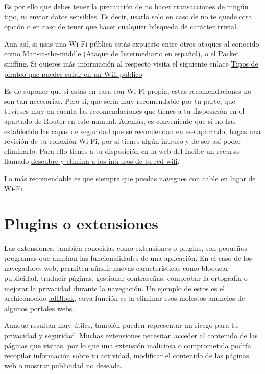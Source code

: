 \documentclass[
  spanish,
  a4paper,
  openany]{book}
\begin{document}
Es por ello que debes tener la precaución de no hacer transacciones de ningún tipo, ni enviar datos sensibles. Es decir, usarla solo en caso de no te quede otra opción o en caso de tener que hacer cualquier búsqueda de carácter trivial.

Aun así, si usas una Wi-Fi pública estás expuesto entre otros ataques al conocido como Man-in-the-middle (Ataque de Intermediario en español), o el Packet sniffing. Si quieres más información al respecto visita el siguiente enlace \href{https://as.com/meristation/2020/02/04/betech/1580856719_548183.html}{Tipos de pirateo que puedes sufrir en un Wifi público}

Es de suponer que si estas en casa con Wi-Fi propia, estas recomendaciones no son tan necesarias. Pero sí, que sería muy recomendable por tu parte, que tuvieses muy en cuenta las recomendaciones que tienes a tu disposición en el apartado de Router en este manual. Además, es conveniente que si no has establecido las capas de seguridad que se recomiendan en ese apartado, hagas una revisión de tu conexión Wi-Fi, por si tienes algún intruso y de ser así poder eliminarlo. Para ello tienes a tu disposición en la web del Incibe un recurso llamado \href{https://www.osi.es/es/actualidad/blog/2019/09/25/descubre-y-elimina-los-intrusos-de-tu-red-wifi}{descubre y elimina a los intrusos de tu red wifi}.

Lo más recomendable es que siempre que puedas navegues con cable en lugar de Wi-Fi.

\section{Plugins o extensiones}\label{plugins-o-extensiones}

Las extensiones, también conocidas como extensiones o plugins, son pequeños programas que amplían las funcionalidades de una aplicación. En el caso de los navegadores web, permiten añadir nuevas características como bloquear publicidad, traducir páginas, gestionar contraseñas, comprobar la ortografía o mejorar la privacidad durante la navegación. Un ejemplo de estos es el archiconocido \href{https://getadblock.com/}{adBlock}, cuya función es la eliminar esos molestos anuncios de algunos portales webs.

Aunque resultan muy útiles, también pueden representar un riesgo para tu privacidad y seguridad. Muchas extensiones necesitan acceder al contenido de las páginas que visitas, por lo que una extensión maliciosa o comprometida podría recopilar información sobre tu actividad, modificar el contenido de las páginas web o mostrar publicidad no deseada.
\end{document}
